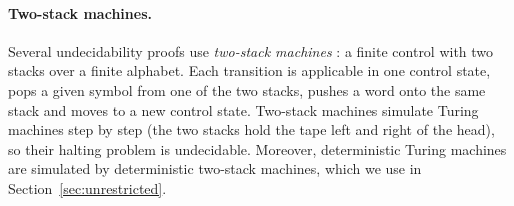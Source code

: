 \paragraph{Two-stack machines.}
Several undecidability proofs use \emph{two-stack machines} \parencite{minsky:67}: a finite
control with two stacks over a finite alphabet. Each transition is applicable in one control
state, pops a given symbol from one of the two stacks, pushes a word onto the same stack and moves
to a new control state. Two-stack machines simulate Turing machines step by step (the two stacks
hold the tape left and right of the head), so their halting problem is undecidable. Moreover,
deterministic Turing machines are simulated by deterministic two-stack machines, which we use in
Section~\ref{sec:unrestricted}.
